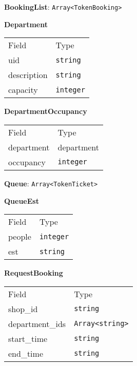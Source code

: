 \begin{center}\textbf{BookingList}: \texttt{Array<TokenBooking>}\end{center}


    \begin{table}[H]
    \centering
    \textbf{Department}\\
    \everyrow{\tabucline[0.5pt]-}
    \begin{tabu} to 0.55\textwidth {|X|X|} \hline
    Field & Type \\
    uid & \texttt{string} \\
description & \texttt{string} \\
capacity & \texttt{integer} \\
\end{tabu}
\end{table}


    \begin{table}[H]
    \centering
    \textbf{DepartmentOccupancy}\\
    \everyrow{\tabucline[0.5pt]-}
    \begin{tabu} to 0.55\textwidth {|X|X|} \hline
    Field & Type \\
    department & department \\
occupancy & \texttt{integer} \\
\end{tabu}
\end{table}

\begin{center}\textbf{Queue}: \texttt{Array<TokenTicket>}\end{center}


    \begin{table}[H]
    \centering
    \textbf{QueueEst}\\
    \everyrow{\tabucline[0.5pt]-}
    \begin{tabu} to 0.55\textwidth {|X|X|} \hline
    Field & Type \\
    people & \texttt{integer} \\
est & \texttt{string} \\
\end{tabu}
\end{table}


    \begin{table}[H]
    \centering
    \textbf{RequestBooking}\\
    \everyrow{\tabucline[0.5pt]-}
    \begin{tabu} to 0.55\textwidth {|X|X|} \hline
    Field & Type \\
    shop\_id & \texttt{string} \\
department\_ids & \texttt{Array<string>} \\
start\_time & \texttt{string} \\
end\_time & \texttt{string} \\
\end{tabu}
\end{table}


